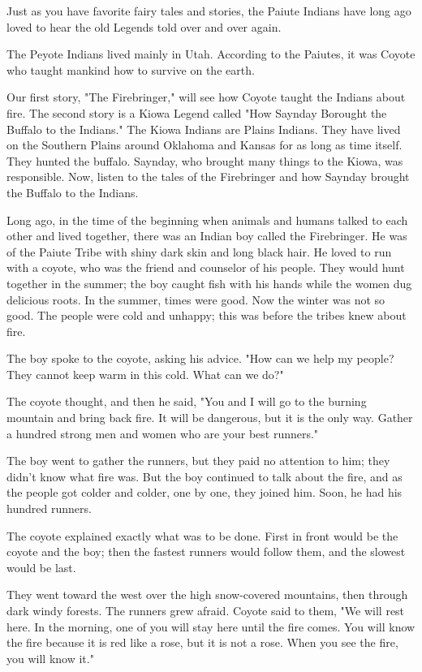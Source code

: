 Just as you have favorite fairy tales and stories, the Paiute Indians have long ago loved to hear the old Legends told over and over again.

The Peyote Indians lived mainly in Utah. According to the Paiutes, it was Coyote who taught mankind how to survive on the earth.

Our first story, "The Firebringer," will see how Coyote taught the Indians about fire. The second story is a Kiowa Legend called "How Saynday Borought the Buffalo to the Indians." The Kiowa Indians are Plains Indians. They have lived on the Southern Plains around Oklahoma and Kansas for as long as time itself. They hunted the buffalo. Saynday, who brought many things to the Kiowa, was responsible. Now, listen to the tales of the Firebringer and how Saynday brought the Buffalo to the Indians.

Long ago, in the time of the beginning when animals and humans talked to each other and lived together, there was an Indian boy called the Firebringer. He was of the Paiute Tribe with shiny dark skin and long black hair. He loved to run with a coyote, who was the friend and counselor of his people. They would hunt together in the summer; the boy caught fish with his hands while the women dug delicious roots. In the summer, times were good. Now the winter was not so good. The people were cold and unhappy; this was before the tribes knew about fire.

The boy spoke to the coyote, asking his advice. "How can we help my people? They cannot keep warm in this cold. What can we do?"

The coyote thought, and then he said, "You and I will go to the burning mountain and bring back fire. It will be dangerous, but it is the only way. Gather a hundred strong men and women who are your best runners."

The boy went to gather the runners, but they paid no attention to him; they didn't know what fire was. But the boy continued to talk about the fire, and as the people got colder and colder, one by one, they joined him. Soon, he had his hundred runners.

The coyote explained exactly what was to be done. First in front would be the coyote and the boy; then the fastest runners would follow them, and the slowest would be last.

They went toward the west over the high snow-covered mountains, then through dark windy forests. The runners grew afraid. Coyote said to them, "We will rest here. In the morning, one of you will stay here until the fire comes. You will know the fire because it is red like a rose, but it is not a rose. When you see the fire, you will know it."

